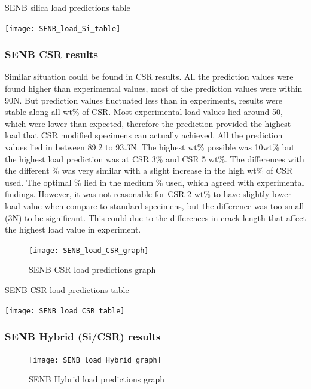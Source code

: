 \documentclass[numbers=noendperiod,chapterprefix=on]{icldt} %
\begin{document}
 \begin{table}
 \centering
 \caption{SENB silica load predictions table}\label{SENB_load_Si_table}
 \texttt{[image: SENB\_load\_Si\_table]}
 \end{table}
 \FloatBarrier  

\subsubsection{SENB CSR results}
Similar situation could be found in CSR results. All the prediction values were found higher than experimental values, most of the prediction values were within 90N. But prediction values fluctuated less than in experiments, results were stable along all wt\% of CSR. Most experimental load values lied around 50, which were lower than expected, therefore the prediction provided the highest load that CSR modified specimens can actually achieved. 
All the prediction values lied in between 89.2 to 93.3N. The highest wt\% possible was 10wt\% but the highest load prediction was at CSR 3\% and CSR 5 wt\%. The differences with the different \% was very similar with a slight increase in the high wt\% of CSR used.  The optimal \% lied in the medium \% used, which agreed with experimental findings. However, it was not reasonable for CSR 2 wt\% to have slightly lower load value when compare to standard specimens, but the difference was too small (3N) to be significant. This could due to the differences in crack length that affect the highest load value in experiment. 

\begin{figure}[!hp]
\centering
\texttt{[image: SENB\_load\_CSR\_graph]}\label{SENB_load_CSR_graph}
\caption{SENB CSR load predictions graph}
\end{figure}


 \begin{table}
 \centering
 \caption{SENB CSR load predictions table}\label{SENB_load_CSR_table}
 \texttt{[image: SENB\_load\_CSR\_table]}
 \end{table}
 \FloatBarrier  
 
 \subsubsection{SENB Hybrid (Si/CSR) results}
 
 \begin{figure}[!hp]
 \centering
 \texttt{[image: SENB\_load\_Hybrid\_graph]}\label{SENB_load_Hybrid_graph}
 \caption{SENB Hybrid load predictions graph}
 \end{figure}
 \FloatBarrier
 
\end{document}

